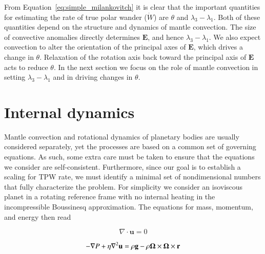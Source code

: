 \documentclass[preprint,12pt,authoryear]{elsarticle}
\newcommand{\mitbf}[1]{\hbox{\mathversion{bold}$#1$}}
\begin{document}
From Equation~\eqref{eq:simple_milankovitch} it is clear that the important quantities for estimating the rate of true polar wander ($\dot{W}$)
are $\theta$ and $\lambda_3 - \lambda_1$. Both of these quantities depend on the structure and dynamics of mantle convection.  The size of
convective anomalies directly determines $\mathbf{E}$, and hence $\lambda_3-\lambda_1$. We also expect convection to alter the orientation of the principal axes of $\mathbf{E}$, which drives a change in $\theta$. Relaxation of the rotation axis back toward the principal axis of $\mathbf{E}$ acts to reduce $\theta$. In the next section we focus on the role of mantle convection in setting $\lambda_3-\lambda_1$ and in driving changes in $\theta$.



\section{Internal dynamics}
\label{sec:internal}

Mantle convection and rotational dynamics of planetary bodies are usually considered separately, yet the processes are based on a common set of governing equations. 
As such, some extra care must be taken to ensure that the equations we consider are self-consistent. 
Furthermore, since our goal is to establish a scaling for TPW rate, we must identify a minimal set of nondimensional numbers that fully characterize the problem.
For simplicity we consider an isoviscous planet in a rotating reference frame with no internal heating in the incompressible Boussinesq approximation.  The equations for mass, momentum, and energy then read

\begin{equation}
\nabla \cdot \mathbf{u} = 0
\label{eq:conserve_mass}
\end{equation}

\begin{equation}
\begin{aligned}
- \nabla P + \eta \nabla^2 \mathbf{u} =  \rho \mathbf{g} -  \rho \mitbf{\Omega} \times \mitbf{\Omega} \times \mathbf{r}
\label{eq:navier_stokes}
\end{aligned}
\end{equation}
\end{document}
